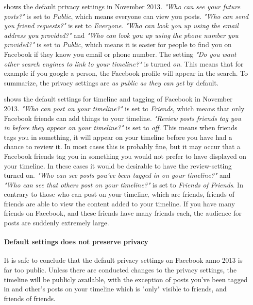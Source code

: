 shows the default privacy settings in November 2013.  \textit{"Who can see your future posts?"} is set to \textit{Public}, which means everyone can view you posts. \textit{"Who can send you friend requests?"} is set to \textit{Everyone}. \textit{"Who can look you up using the email address you provided?"} and \textit{"Who can look you up using the phone number you provided?"} is set to \textit{Public}, which means it is easier for people to find you on Facebook if they know you email or phone number. The setting \textit{"Do you want other search engines to link to your timeline?"} is turned \textit{on}. This means that for example if you google a person, the Facebook profile will appear in the search. To summarize, the privacy settings are \textit{as public as they can get} by default. 

 shows the default settings for timeline and tagging of Facebook in November 2013. \textit{"Who can post on your timeline?"} is set to \textit{Friends}, which means that only Facebook friends can add things to your timeline. \textit{"Review posts friends tag you in before they appear on your timeline?" }is set to\textit{ off}. This means when friends tags you in something, it will appear on your timeline before you have had a chance to review it. In most cases this is probably fine, but it may occur that a Facebook friends tag you in something you would not prefer to have displayed on your timeline. In these cases it would be desirable to have the review-setting turned on. \textit{"Who can see posts you've been tagged in on your timeline?"} and \textit{"Who can see that others post on your timeline?"} is set to \textit{Friends of Friends}. In contrary to those who can post on your timeline, which are friends, friends of friends are able to view the content added to your timeline. If you have many friends on Facebook, and these friends have many friends each, the audience for posts are suddenly extremely large. 

\paragraph{Default settings does not preserve privacy} It is safe to conclude that the default privacy settings on Facebook anno 2013 is far too public. Unless there are conducted changes to the privacy settings, the timeline will be publicly available, with the exception of posts you've been tagged in and other's posts on your timeline which is "only" visible to friends, and friends of friends. 

